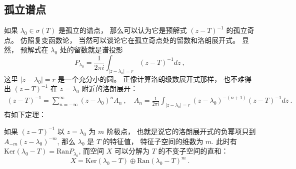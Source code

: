 \subsection{孤立谱点}
如果 $\lambda_0\in\sigma(T)$ 是孤立的谱点， 那么可以认为它是预解式 $(z-T)^{-1}$ 的孤立奇点。 仿照复变函数论， 当然可以谈论它在孤立奇点处的留数和洛朗展开式。 显然， 预解式在 $\lambda_0$ 处的留数就是谱投影
$$
P_{\lambda_0}=\frac{1}{2\pi i}\int_{|z-\lambda_0|=r}(z-T)^{-1}dz~,
$$
这里 $|z-\lambda_0|=r$ 是一个充分小的圆。 正像计算洛朗级数展开式那样， 也不难得出 $(z-T)^{-1}$ 在 $z=\lambda_0$ 附近的洛朗展开：
$$
\begin{aligned}
(z-T)^{-1}
=\sum_{n=-\infty}^\infty(z-\lambda_0)^nA_n~,
\quad
A_n=\frac{1}{2\pi i}\int_{|z-\lambda_0|=r}(z-\lambda_0)^{-(n+1)}(z-T)^{-1}dz~.
\end{aligned}
$$
有如下定理：
\begin{theorem}{}
如果 $(z-T)^{-1}$ 以 $z=\lambda_0$ 为 $m$ 阶极点， 也就是说它的洛朗展开式的负幂项只到 $A_{-m}(z-\lambda_0)^{-m}$, 那么 $\lambda_0$ 是 $T$ 的特征值， 特征子空间的维数为 $m$. 此时有 $\text{Ker}(\lambda_0-T)=\text{Ran}P_{\lambda_0}$, 而空间 $X$ 可以分解为 $T$ 的不变子空间的直和：
$$
X=\text{Ker}(\lambda_0-T)\oplus \text{Ran}(\lambda_0-T)^m~.
$$
\end{theorem}
